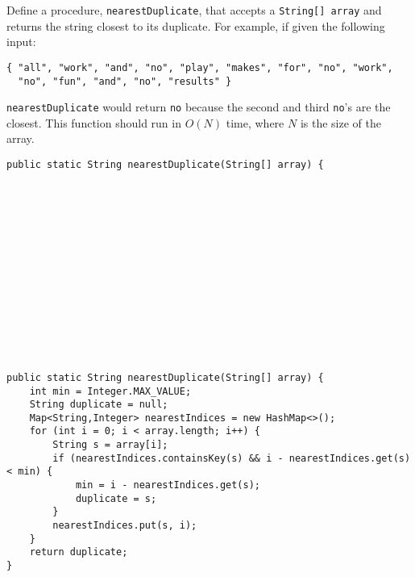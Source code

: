 \question Define a procedure, \texttt{nearestDuplicate}, that accepts a \texttt{String[] array} and returns the string closest to its duplicate. For example, if given the following input:

\begin{verbatim}
{ "all", "work", "and", "no", "play", "makes", "for", "no", "work",
  "no", "fun", "and", "no", "results" }
\end{verbatim}

\texttt{nearestDuplicate} would return \texttt{no} because the second and third \texttt{no}'s are the closest. This function should run in $O(N)$ time, where $N$ is the size of the array.

\ifprintanswers
\else
\begin{lstlisting}
public static String nearestDuplicate(String[] array) {















\end{lstlisting}
\fi

\begin{solution}
\begin{lstlisting}
public static String nearestDuplicate(String[] array) {
    int min = Integer.MAX_VALUE;
    String duplicate = null;
    Map<String,Integer> nearestIndices = new HashMap<>();
    for (int i = 0; i < array.length; i++) {
        String s = array[i];
        if (nearestIndices.containsKey(s) && i - nearestIndices.get(s) < min) {
            min = i - nearestIndices.get(s);
            duplicate = s;
        }
        nearestIndices.put(s, i);
    }
    return duplicate;
}
\end{lstlisting}
\end{solution}
